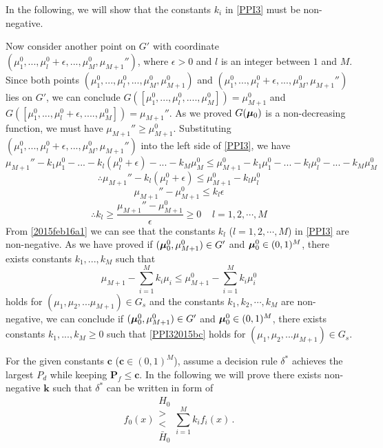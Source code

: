 In the following, we will show that the constants $k_i$ in \eqref{PPI3} must be non-negative.   

Now consider another point on $G'$ with coordinate $(\mu_1^0, ..., \mu_l^0+\epsilon, ..., \mu_M^0, \mu_{M+1}'')$, where $\epsilon > 0$ and $l$ is an integer between $1$ and $M$.  Since both points $(\mu_1^0, ..., \mu_l^0, ..., \mu_M^0, \mu_{M+1}^0)$ and $(\mu_1^0, ..., \mu_l^0+\epsilon, ..., \mu_M^0, \mu_{M+1}'')$ lies on $G'$, we can conclude $G([\mu_1^0, ..., \mu_l^0, ...., \mu_M^0]) = \mu_{M+1}^0$ and $G([\mu_1^0, ..., \mu_l^0 + \epsilon, ...., \mu_M^0]) = \mu_{M+1}''$. As we proved $G(\boldsymbol{\mu}_0)$ is a non-decreasing function, we must have  $\mu_{M+1}'' \geq \mu_{M+1}^0$.
Substituting $(\mu_1^0, ..., \mu_l^0+\epsilon, ..., \mu_M^0, \mu_{M+1}'')$ into the left side of \eqref{PPI3}, we have
\begin{equation}
\mu_{M+1}'' - k_1\mu_1^0 - ... - k_l(\mu_l^0+\epsilon)- ... - k_M\mu_M^0 \leq \mu_{M+1}^0 - k_1\mu_1^0 - ... - k_l\mu_l^0- ... - k_M\mu_M^0
\end{equation}
\begin{equation}
\therefore \mu_{M+1}'' - k_l(\mu_l^0+\epsilon)\leq \mu_{M+1}^0 - k_l\mu_l^0
\end{equation}
\begin{equation}
\mu_{M+1}'' - \mu_{M+1}^0 \leq k_l\epsilon
\end{equation}
\begin{equation}
\therefore k_l \geq \frac{\mu_{M+1}'' - \mu_{M+1}^0}{\epsilon} \geq 0 \;\;\;\;l = 1, 2, \cdots, M
\label{2015feb16a1}
\end{equation}
From \eqref{2015feb16a1} we can see that the constants $k_l$ ($l = 1, 2, \cdots, M$) in \eqref{PPI3} are non-negative.
As we have proved if  $(\boldsymbol{\mu}_0^0, \mu_{M+1}^0) \in G'$ and $\boldsymbol{\mu}_0^0 \in (0, 1)^M$, there exists constants $k_1, ..., k_M$ such that  
\begin{equation}
\mu_{M+1} - \sum_{i=1}^{M}k_i\mu_i \leq \mu_{M+1}^0 - \sum_{i=1}^{M}k_i\mu_i^0
\label{PPI32015bc}
\end{equation}
holds for  $(\mu_1, \mu_2, ...\mu_{M+1}) \in G_s$ and the constants $k_1, k_2, \cdots, k_M$ are non-negative,  
we can conclude 
if  $(\boldsymbol{\mu}_0^0, \mu_{M+1}^0) \in G'$ and $\boldsymbol{\mu}_0^0 \in (0, 1)^M$, there exists constants $k_1, ..., k_M \geq 0 $ such that  
\eqref{PPI32015bc}
holds for  $(\mu_1, \mu_2, ...\mu_{M+1}) \in G_s$. 

For the given constants $\mathbf{c}$ ($\mathbf{c} \in (0, 1)^M$), 
 assume a decision rule $\delta^\ast$  achieves the largest $P_d$  while keeping $\mathbf{P}_f \leq \mathbf{c}$. In the following we will prove there exists non-negative $\mathbf{k}$  such that $\delta^\ast$ can be written in form of 
\[
f_0(x) \substack{H_0 \\ > \\ < \\ \bar{H}_0 } \sum_{i=1}^{M}k_if_i(x)\,.
\]

